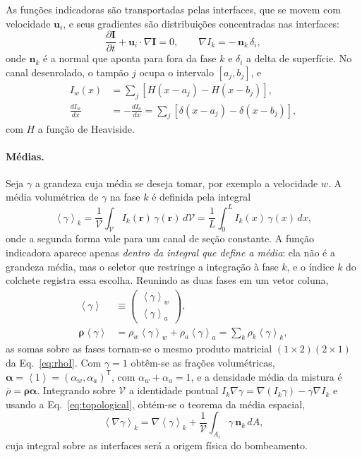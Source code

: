 \documentclass[aps,pre,twocolumn,superscriptaddress,nofootinbib,floatfix]{revtex4-2}
\newcommand{\avg}[1]{\left\langle #1 \right\rangle}
\newcommand{\dV}{\mathcal{V}}
\begin{document}
As funções indicadoras são transportadas pelas interfaces, que se movem com velocidade $\bm u_i$, e seus gradientes são distribuições concentradas nas interfaces:
\begin{equation}
  \frac{\partial \mathbf I}{\partial t} + \bm u_i\cdot\nabla \mathbf I = 0, \qquad
  \nabla I_k = -\,\bm n_k\,\delta_i ,
  \label{eq:topological}
\end{equation}
onde $\bm n_k$ é a normal que aponta para fora da fase $k$ e $\delta_i$ a delta de superfície. No canal desenrolado, o tampão $j$ ocupa o intervalo $[a_j,b_j]$, e
\begin{align}
  I_w(x) &= \sum_{j}\left[H(x-a_j)-H(x-b_j)\right], \nonumber\\
  \frac{dI_w}{dx} &= -\frac{dI_a}{dx} = \sum_j\left[\delta(x-a_j)-\delta(x-b_j)\right],
  \label{eq:Iw}
\end{align}
com $H$ a função de Heaviside.

\paragraph*{Médias.} Seja $\gamma$ a grandeza cuja média se deseja tomar, por exemplo a velocidade $w$. A média volumétrica de $\gamma$ na fase $k$ é definida pela integral~\cite{whitaker1999}
\begin{equation}
  \avg{\gamma}_k = \frac{1}{\dV}\int_\dV I_k(\bm r)\,\gamma(\bm r)\,d\dV
  = \frac1L\int_0^L I_k(x)\,\gamma(x)\,dx,
  \label{eq:avg}
\end{equation}
onde a segunda forma vale para um canal de seção constante. A função indicadora aparece apenas \emph{dentro da integral que define a média}: ela não é a grandeza média, mas o seletor que restringe a integração à fase $k$, e o índice $k$ do colchete registra essa escolha. Reunindo as duas fases em um vetor coluna,
\begin{align}
  \avg{\gamma} &\equiv \begin{pmatrix}\avg{\gamma}_w\\ \avg{\gamma}_a\end{pmatrix}, \nonumber\\
  \bm\rho\avg{\gamma} &= \rho_w\avg{\gamma}_w + \rho_a\avg{\gamma}_a = \sum_k\rho_k\avg{\gamma}_k ,
  \label{eq:avgvec}
\end{align}
as somas sobre as fases tornam-se o mesmo produto matricial $(1\times2)(2\times1)$ da Eq.~\eqref{eq:rhoI}. Com $\gamma=1$ obtêm-se as frações volumétricas, $\bm\alpha=\avg{1}=(\alpha_w,\alpha_a)^{\mathsf T}$, com $\alpha_w+\alpha_a=1$, e a densidade média da mistura é $\bar\rho=\bm\rho\bm\alpha$. Integrando sobre $\dV$ a identidade pontual $I_k\nabla\gamma=\nabla(I_k\gamma)-\gamma\nabla I_k$ e usando a Eq.~\eqref{eq:topological}, obtém-se o teorema da média espacial,
\begin{equation}
  \avg{\nabla\gamma}_k = \nabla\avg{\gamma}_k + \frac{1}{\dV}\int_{A_i}\gamma\,\bm n_k\,dA ,
  \label{eq:averaging_theorem}
\end{equation}
cuja integral sobre as interfaces será a origem física do bombeamento.
\end{document}
